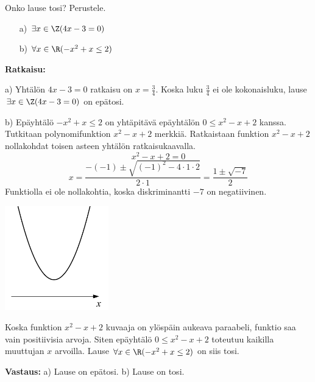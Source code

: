 \begin{esimerkki}
Onko lause tosi? Perustele.
\begin{itemize}
\item[a)] $\exists x\in \Z(4x - 3 = 0)$
\item[b)] $\forall x\in \R(-x^2 + x \le 2)$
\end{itemize}

{\bf Ratkaisu:}

a) Yhtälön $4x - 3 = 0$ ratkaisu on $x = \frac{3}{4}$. Koska luku $\frac{3}{4}$ ei ole kokonaisluku, lause $\exists x\in \Z(4x - 3 = 0)$ on epätosi.

b) Epäyhtälö $-x^2+x \le 2$ on yhtäpitävä epäyhtälön $0 \le x^2 - x + 2$ kanssa. Tutkitaan polynomifunktion $x^2 - x + 2$ merkkiä. Ratkaistaan funktion $x^2 - x + 2$ nollakohdat toisen asteen yhtälön ratkaisukaavalla.
\[
x^2 - x + 2 = 0
\]
\[
x=\frac{-(-1) \pm \sqrt{(-1)^2 -4\cdot 1 \cdot 2}}{2 \cdot 1}=\frac{1 \pm \sqrt{-7}}{2}
\]
Funktiolla ei ole nollakohtia, koska diskriminantti $-7$ on negatiivinen. 

\bigskip

\begin{center}
\includegraphics[width=4.5cm]{pictures/kpl3_3_paraabeli}
\end{center}

Koska funktion $x^2 - x + 2$ kuvaaja on ylöspäin aukeava paraabeli, funktio saa vain positiivisia arvoja. Siten epäyhtälö $0 \le x^2 - x + 2$ toteutuu kaikilla muuttujan $x$ arvoilla. Lause $\forall x\in \R(-x^2 + x \le 2)$ on siis tosi.

{\bf Vastaus:} a) Lause on epätosi. b) Lause on tosi.
\end{esimerkki}

